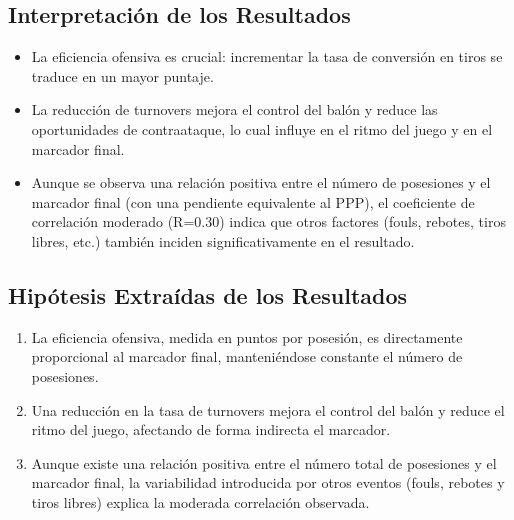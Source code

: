 \documentclass[12pt]{article}
\begin{document}
\subsection{Interpretación de los Resultados}
\begin{itemize}
    \item La eficiencia ofensiva es crucial: incrementar la tasa de conversión en tiros se traduce en un mayor puntaje.
    \item La reducción de turnovers mejora el control del balón y reduce las oportunidades de contraataque, lo cual influye en el ritmo del juego y en el marcador final.
    \item Aunque se observa una relación positiva entre el número de posesiones y el marcador final (con una pendiente equivalente al PPP), el coeficiente de correlación moderado (R=0.30) indica que otros factores (fouls, rebotes, tiros libres, etc.) también inciden significativamente en el resultado.
\end{itemize}

\subsection{Hipótesis Extraídas de los Resultados}
\begin{enumerate}
    \item La eficiencia ofensiva, medida en puntos por posesión, es directamente proporcional al marcador final, manteniéndose constante el número de posesiones.
    \item Una reducción en la tasa de turnovers mejora el control del balón y reduce el ritmo del juego, afectando de forma indirecta el marcador.
    \item Aunque existe una relación positiva entre el número total de posesiones y el marcador final, la variabilidad introducida por otros eventos (fouls, rebotes y tiros libres) explica la moderada correlación observada.
\end{enumerate}
\end{document}
